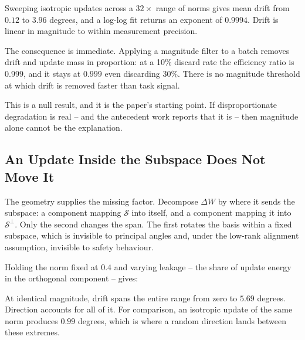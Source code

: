 \documentclass[10pt,twocolumn,letterpaper]{article}
\begin{document}
Sweeping isotropic updates across a $32\times$ range of norms gives mean drift from $0.12$ to $3.96$ degrees, and a log-log fit returns an exponent of $0.9994$. Drift is linear in magnitude to within measurement precision.

The consequence is immediate. Applying a magnitude filter to a batch removes drift and update mass in proportion: at a 10\% discard rate the efficiency ratio is $0.999$, and it stays at $0.999$ even discarding 30\%. There is no magnitude threshold at which drift is removed faster than task signal.

This is a null result, and it is the paper's starting point. If disproportionate degradation is real -- and the antecedent work reports that it is -- then magnitude alone cannot be the explanation.


\subsection{An Update Inside the Subspace Does Not Move It}


The geometry supplies the missing factor. Decompose $\Delta W$ by where it sends the subspace: a component mapping $\mathcal{S}$ into itself, and a component mapping it into $\mathcal{S}^{\perp}$. Only the second changes the span. The first rotates the basis within a fixed subspace, which is invisible to principal angles and, under the low-rank alignment assumption, invisible to safety behaviour.

Holding the norm fixed at $0.4$ and varying leakage -- the share of update energy in the orthogonal component -- gives:
\begin{table}[htbp]
\centering
{}
\end{table}

At identical magnitude, drift spans the entire range from zero to $5.69$ degrees. Direction accounts for all of it. For comparison, an isotropic update of the same norm produces $0.99$ degrees, which is where a random direction lands between these extremes.
\end{document}
